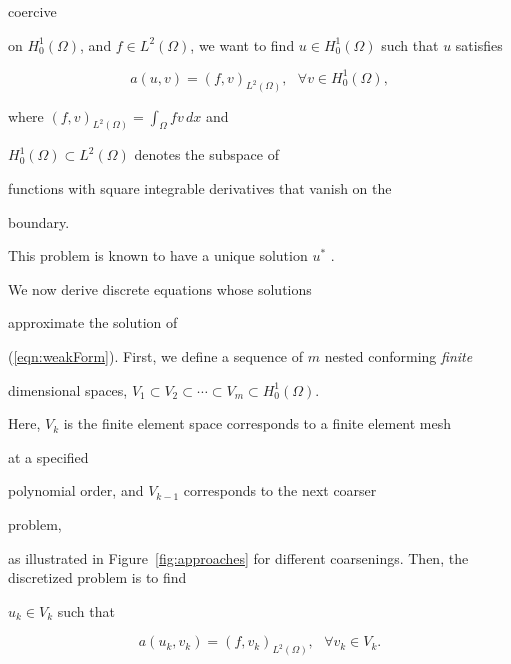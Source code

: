 \documentclass[smallcondensed,final]{svjour3}     %
\begin{document}
coercive

on $H_0^{1}(\Omega)$, and $f \in L^{2}(\Omega)$, we want to find $u

\in H_0^{1}(\Omega)$ such that $u$ satisfies

\begin{equation}

\label{eqn:weakForm}

a(u,v) =  (f,v)_{L^2(\Omega)}, \ \ \ \forall v \in H_0^{1}(\Omega),

\end{equation}

where $(f,v)_{L^2(\Omega)} = \int_\Omega fv\,dx$ and

$H_0^1(\Omega)\subset L^2(\Omega)$ denotes the subspace of

functions with square integrable derivatives that vanish on the

boundary.

This problem is known to have a unique solution $u^*$ \cite{BrennerScott94}. 

We now derive discrete equations whose solutions

approximate the solution of

(\ref{eqn:weakForm}). First, we define a sequence of $m$ nested conforming {\em finite}

dimensional spaces, $V_1 \subset V_2 \subset \cdots \subset V_m \subset

H_0^{1}(\Omega)$.

Here, $V_k$ is the finite element space corresponds to a finite element mesh

at a specified

polynomial order, and $V_{k-1}$ corresponds to the next coarser

problem,




as illustrated  in Figure~\ref{fig:approaches} for different coarsenings.  Then, the discretized problem is to find

$u_k \in V_k$ such that

\begin{equation}

\label{eqn:galerkinForm}

a(u_{k},v_k) = (f,v_k)_{L^2(\Omega)}, \ \ \ \forall v_k \in V_k.

\end{equation}
\end{document}

